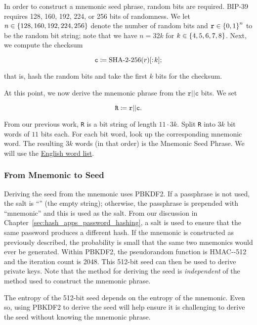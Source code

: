 In order to construct a mnemonic seed phrase, random bits are required.
BIP-39 requires 128, 160, 192, 224, or 256 bits of randomness.
We let $n\in\left\{ 128, 160, 192, 224, 256 \right\}$ denote the number
of random bits and $\texttt{r}\in\left\{ 0,1 \right\}^{n}$ to be the random bit string;
note that we have $n = 32k$ for $k\in\left\{ 4,5,6,7,8 \right\}$.
Next, we compute the checksum

\begin{equation}
    \texttt{c} \mathDef{} \text{\ShaTwo{}-256}(r)[:\!k];
\end{equation}

\noindent
that is, hash the random bits and take the first $k$ bits for the checksum.

At this point, we now derive the mnemonic phrase from the
$\texttt{r}||\texttt{c}$ bits.
We set

\begin{equation}
    \texttt{R} \coloneqq{} \texttt{r}||\texttt{c}.
\end{equation}

\noindent
From our previous work, \texttt{R} is a bit string of length $11\cdot3k$.
Split \texttt{R} into $3k$ bit words of $11$ bits each.
For each bit word, look up the corresponding mnemonic word.
The resulting $3k$ words (in that order) is the Mnemonic Seed Phrase.
We will use the
\href{https://github.com/bitcoin/bips/blob/master/bip-0039/english.txt}{English word list}.

\subsubsection{From Mnemonic to Seed}

Deriving the seed from the mnemonic uses PBKDF2.
If a passphrase is not used, the \gls{salt} is ``'' (the empty string);
otherwise, the passphrase is prepended with ``mnemonic'' and
this is used as the \gls{salt}.
From our discussion in Chapter~\ref{sec:hash_apps_password_hashing},
a \gls{salt} is used to ensure that the same password produces
a different hash.
If the mnemonic is constructed as previously described,
the probability is small that the same two mnemonics would ever be generated.
Within PBKDF2, the pseudorandom function is HMAC-\ShaTwo{}-512
and the iteration count is 2048.
This 512-bit seed can then be used to derive private keys.
Note that the method for deriving the seed is \emph{independent}
of the method used to construct the mnemonic phrase.

The entropy of the 512-bit seed depends on the entropy of the mnemonic.
Even so, using PBKDF2 to derive the seed will help ensure
it is challenging to derive the seed without knowing the mnemonic phrase.

